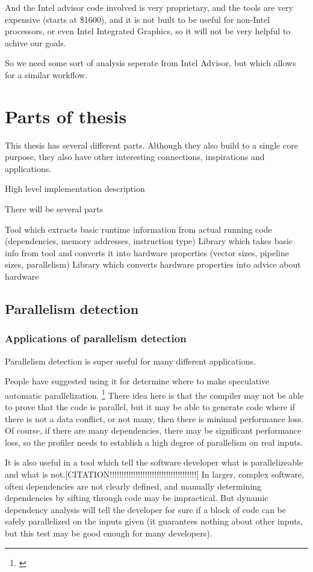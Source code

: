 \documentclass[12pt,twoside]{reedthesis}
\begin{document}
		And the Intel advisor code involved is very proprietary, and the tools are very expensive (starts at \$1600), and it is not built to be useful for non-Intel processors, or even Intel Integrated Graphics, so it will not be very helpful to achive our goals.

		So we need some sort of analysis seperate from Intel Advisor, but which allows for a similar workflow.

	\section{Parts of thesis}

		This thesis has several different parts. Although they also build to a single core purpose, they also have other interesting connections, inspirations and applications.


		High level implementation description

		There will be several parts

		Tool which extracts basic runtime information from actual running code (dependencies, memory addresses, instruction type)
		Library which takes basic info from tool and converts it into hardware properties (vector sizes, pipeline sizes, parallelism)
		Library which converts hardware properties into advice about hardware


	\subsection{Parallelism detection}

		\subsubsection{Applications of parallelism detection}

		Parallelism detection is super useful for many different applications.

		People have suggested using it for determine where to make speculative automatic parallelization. \footnote{\cite{Chen:2004}} There idea here is that the compiler may not be able to prove that the code is parallel, but it may be able to generate code where if there is not a data conflict, or not many, then there is minimal performance loss. Of course, if there are many dependencies, there may be significant performance loss, so the profiler needs to establish a high degree of parallelism on real inputs.

		It is also useful in a tool which tell the software developer what is parallelizeable and what is not.[CITATION!!!!!!!!!!!!!!!!!!!!!!!!!!!!!!!!!!!!!]
		In larger, complex software, often dependencies are not clearly defined, and manually determining dependencies by sifting through code may be impractical. But dynamic dependency analysis will tell the developer for sure if a block of code can be safely parallelized on the inputs given (it guarantees nothing about other inputs, but this test may be good enough for many developers).
\end{document}
